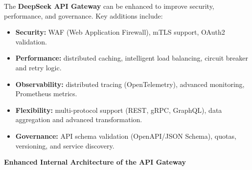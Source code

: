 \documentclass[a4paper,11pt]{article}
\begin{document}
The \textbf{DeepSeek API Gateway} can be enhanced to improve security, performance, and governance.  
Key additions include:  

\begin{itemize}
  \item \textbf{Security:} WAF (Web Application Firewall), mTLS support, OAuth2 validation.
  \item \textbf{Performance:} distributed caching, intelligent load balancing, circuit breaker and retry logic.
  \item \textbf{Observability:} distributed tracing (OpenTelemetry), advanced monitoring, Prometheus metrics.
  \item \textbf{Flexibility:} multi-protocol support (REST, gRPC, GraphQL), data aggregation and advanced transformation.
  \item \textbf{Governance:} API schema validation (OpenAPI/JSON Schema), quotas, versioning, and service discovery.
\end{itemize}

\vspace{0.5cm}

\begin{center}
\Large \textbf{Enhanced Internal Architecture of the API Gateway}
\end{center}
\vspace{0.5cm}
\end{document}
